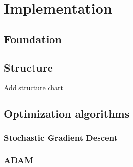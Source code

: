 \section{Implementation} \label{sec:implementation}
\subsection{Foundation} \label{subsec:foundation}
\subsection{Structure} \label{subsec:structure}
Add structure chart
\subsection{Optimization algorithms} \label{subsec:optimization}
\subsubsection{Stochastic Gradient Descent} \label{subsubsec:sgd}
\subsubsection{ADAM} \label{subsubsec:adam}